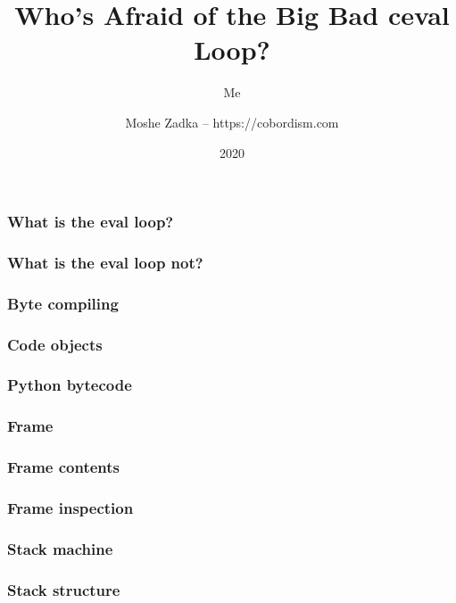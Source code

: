 \usepackage{hyperref}
\usepackage{graphicx}
\usepackage{listings}
\usepackage{textcomp}
\usepackage{fancyvrb}


\title{Who's Afraid of the Big Bad ceval Loop?}
\subtitle{Me}
\author{Moshe Zadka -- https://cobordism.com}
\date{2020}


\begin{titlepage}
\maketitle
\end{titlepage}

\frame{\titlepage}

\begin{frame}
\frametitle{What is the eval loop?}
\end{frame}

\begin{frame}
\frametitle{What is the eval loop not?}
\end{frame}

\begin{frame}
\frametitle{Byte compiling}
\end{frame}

\begin{frame}
\frametitle{Code objects}
\end{frame}

\begin{frame}
\frametitle{Python bytecode}
\end{frame}

\begin{frame}
\frametitle{Frame}
\end{frame}

\begin{frame}
\frametitle{Frame contents}
\end{frame}

\begin{frame}
\frametitle{Frame inspection}
\end{frame}

\begin{frame}
\frametitle{Stack machine}
\end{frame}

\begin{frame}
\frametitle{Stack structure}
\end{frame}

